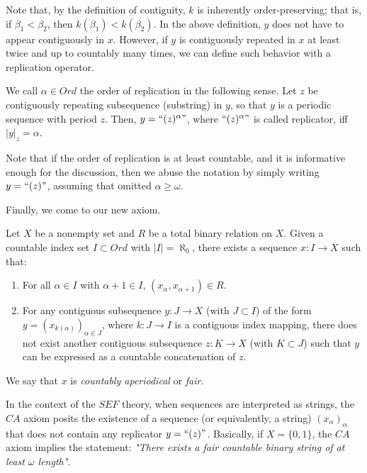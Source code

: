 Note that, by the definition of contiguity, \(k\) is inherently order-preserving; that is, if \(\beta_1 < \beta_2\), then \(k(\beta_1) < k(\beta_2)\). In the above definition, \(y\) does not have to appear contiguously in \(x\). However, if \(y\) is contiguously repeated in \(x\) at least twice and up to countably many times, we can define such behavior with a replication operator.

\begin{definition}\label{def_repstr_seq}
  We call $\alpha \in Ord$ the order of replication in the following sense. Let $z$ be contiguously repeating subsequence (substring) in $y$, so that $y$ is a periodic sequence with period $z$. Then, $y = \text{``}(z)^\alpha\text{''}$, where $\text{``}(z)^\alpha\text{''}$ is called replicator, iff $|y|_z = \alpha$.
\end{definition}

Note that if the order of replication is at least countable, and it is informative enough for the discussion, then we abuse the notation by simply writing $y = \text{``}(z)\text{''}$, assuming that omitted $\alpha \geq \omega$.

Finally, we come to our new axiom.

\begin{definition}\label{def_ca}
  Let \(X\) be a nonempty set and \(R\) be a total binary relation on \(X\). Given a countable index set \(I \subset Ord\) with \(|I| = \aleph_0\), there exists a sequence \(x: I \to X\) such that:
  \begin{enumerate}
      \item For all \(\alpha \in I\) with \(\alpha + 1 \in I\), \((x_\alpha, x_{\alpha+1}) \in R\).
      \item For any contiguous subsequence \(y: J \to X\) (with \(J \subset I\)) of the form \(y = (x_{k(\alpha)})_{\alpha \in J}\), where \(k : J \to I\) is a contiguous index mapping, there does not exist another contiguous subsequence \(z: K \to X\) (with \(K \subset J\)) such that \(y\) can be expressed as a countable concatenation of \(z\).
  \end{enumerate}
  We say that $x$ is \textit{countably aperiodical} or \textit{fair}.
\end{definition}

In the context of the \(SEF\) theory, when sequences are interpreted as strings, the \(CA\) axiom posits the existence of a sequence (or equivalently, a string) \( (x_\alpha)_\alpha \) that does not contain any replicator \( y = \text{``}(z)\text{''} \). Basically, if \( X = \{0,1\} \), the \(CA\) axiom implies the statement: \textit{"There exists a fair countable binary string of at least $\omega$ length"}.

